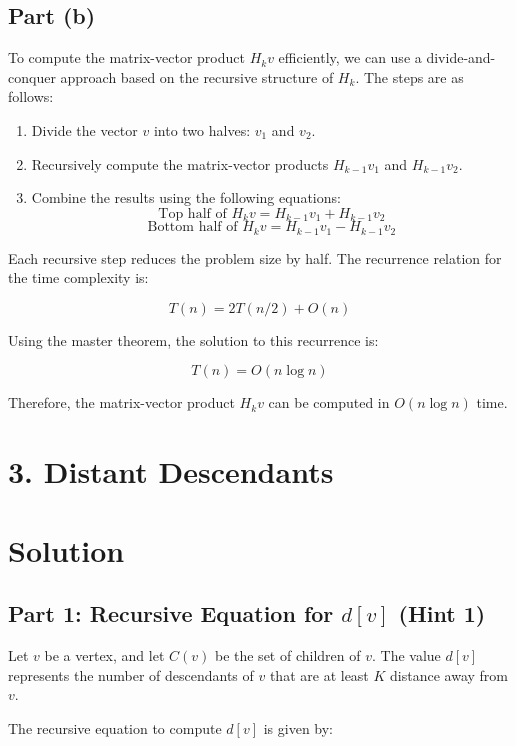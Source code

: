 \documentclass[11pt]{article}
\begin{document}
\subsection*{Part (b)}
To compute the matrix-vector product \( H_k v \) efficiently, we can use a divide-and-conquer approach based on the recursive structure of \( H_k \). The steps are as follows:

\begin{enumerate}
    \item Divide the vector \( v \) into two halves: \( v_1 \) and \( v_2 \).
    \item Recursively compute the matrix-vector products \( H_{k-1} v_1 \) and \( H_{k-1} v_2 \).
    \item Combine the results using the following equations:
    \[
    \text{Top half of } H_k v = H_{k-1} v_1 + H_{k-1} v_2
    \]
    \[
    \text{Bottom half of } H_k v = H_{k-1} v_1 - H_{k-1} v_2
    \]
\end{enumerate}

Each recursive step reduces the problem size by half. The recurrence relation for the time complexity is:

\[
T(n) = 2T(n/2) + O(n)
\]

Using the master theorem, the solution to this recurrence is:

\[
T(n) = O(n \log n)
\]

Therefore, the matrix-vector product \( H_k v \) can be computed in \( O(n \log n) \) time.



\newpage
\section*{3. Distant Descendants}

\section*{Solution}

\subsection*{Part 1: Recursive Equation for \( d[v] \) (Hint 1)}
Let \( v \) be a vertex, and let \( C(v) \) be the set of children of \( v \). The value \( d[v] \) represents the number of descendants of \( v \) that are at least \( K \) distance away from \( v \).

The recursive equation to compute \( d[v] \) is given by:
\end{document}
